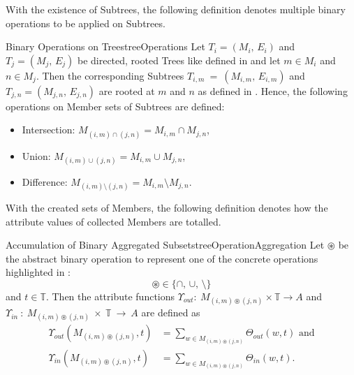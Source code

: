     With the existence of Subtrees, the following definition denotes multiple binary operations to be applied on Subtrees.
    \begin{definitionbox}{Binary Operations on Trees}{treeOperations}
        Let $T_{i} = (M_i,\,E_i)$ and $T_{j} = (M_j,\,E_j)$ be directed, rooted Trees like defined in  and let $m \in M_i$ and $n \in M_j$. Then the corresponding Subtrees $T_{i,m}~=~(M_{i,m},\,E_{i,m})$ and $T_{j,n} = (M_{j,n},\,E_{j,n})$ are rooted at $m$ and $n$ as defined in . \newline
        Hence, the following operations on Member sets of Subtrees are defined:
        \begin{itemize}[label=$\circ$]
            \item Intersection: \hspace{1.6cm}
                $M_{(i,m)\cap (j,n)} = M_{i,m} \cap M_{j,n}$,
            \item Union: \hspace{2.6cm}
                $M_{(i,m)\cup (j,n)} = M_{i,m} \cup M_{j,n}$,
            \item Difference: \hspace{1.92cm}
                $M_{(i,m)\setminus (j,n)} = M_{i,m} \setminus M_{j,n}$.
        \end{itemize}
    \end{definitionbox}

    With the created sets of Members, the following definition denotes how the attribute values of collected Members are totalled.
\begin{samepage}
    \begin{definitionbox}{Accumulation of Binary Aggregated Subsets}{treeOperationAggregation}
       Let $\circledast$ be the abstract binary operation to represent one of the concrete operations highlighted in :
       $$\circledast \in \{\cap,\,\cup,\,\setminus\}$$
       and $t \in \mathbb{T}$. Then the attribute functions $\Upsilon_{out}\colon\:M_{(i,m)\circledast(j,n)}\times \mathbb{T}\to A$ and $\Upsilon_{in}~\colon\:M_{(i,m)\circledast(j,n)}~\times~\mathbb{T}~\to~A$ are defined as
       \begin{align*}
            \Upsilon_{out}(M_{(i,m)\circledast(j,n)},t)&=\sum\limits_{w\in M_{(i,m)\circledast(j,n)}}\Theta_{out}(w,t)\text{ and} \\
            \Upsilon_{in}(M_{(i,m)\circledast(j,n)},t)&=\sum\limits_{w\in M_{(i,m)\circledast(j,n)}}\Theta_{in}(w,t)\text{.}
       \end{align*}
    \end{definitionbox}
\end{samepage}


